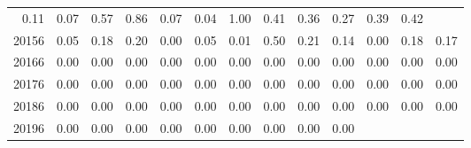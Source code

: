 \begin{table}[!h]
\begin{tabular}{lllllllllllll}
  \multicolumn{1}{|r}{0.11} &
  \multicolumn{1}{r}{0.07} &
  \multicolumn{1}{r}{0.57} &
  \multicolumn{1}{r}{0.86} &
  \multicolumn{1}{r}{0.07} &
  \multicolumn{1}{r}{0.04} &
  \multicolumn{1}{r}{1.00} &
  \multicolumn{1}{r}{0.41} &
  \multicolumn{1}{r}{0.36} &
  \multicolumn{1}{r}{0.27} &
  \multicolumn{1}{r}{0.39} &
  \multicolumn{1}{r}{0.42} \\
\multicolumn{1}{l}{\hspace{1em}20156} &
  \multicolumn{1}{|r}{0.05} &
  \multicolumn{1}{r}{0.18} &
  \multicolumn{1}{r}{0.20} &
  \multicolumn{1}{r}{0.00} &
  \multicolumn{1}{r}{0.05} &
  \multicolumn{1}{r}{0.01} &
  \multicolumn{1}{r}{0.50} &
  \multicolumn{1}{r}{0.21} &
  \multicolumn{1}{r}{0.14} &
  \multicolumn{1}{r}{0.00} &
  \multicolumn{1}{r}{0.18} &
  \multicolumn{1}{r}{0.17} \\
\multicolumn{1}{l}{\hspace{1em}20166} &
  \multicolumn{1}{|r}{0.00} &
  \multicolumn{1}{r}{0.00} &
  \multicolumn{1}{r}{0.00} &
  \multicolumn{1}{r}{0.00} &
  \multicolumn{1}{r}{0.00} &
  \multicolumn{1}{r}{0.00} &
  \multicolumn{1}{r}{0.00} &
  \multicolumn{1}{r}{0.00} &
  \multicolumn{1}{r}{0.00} &
  \multicolumn{1}{r}{0.00} &
  \multicolumn{1}{r}{0.00} &
  \multicolumn{1}{r}{0.00} \\
\multicolumn{1}{l}{\hspace{1em}20176} &
  \multicolumn{1}{|r}{0.00} &
  \multicolumn{1}{r}{0.00} &
  \multicolumn{1}{r}{0.00} &
  \multicolumn{1}{r}{0.00} &
  \multicolumn{1}{r}{0.00} &
  \multicolumn{1}{r}{0.00} &
  \multicolumn{1}{r}{0.00} &
  \multicolumn{1}{r}{0.00} &
  \multicolumn{1}{r}{0.00} &
  \multicolumn{1}{r}{0.00} &
  \multicolumn{1}{r}{0.00} &
  \multicolumn{1}{r}{0.00} \\
\multicolumn{1}{l}{\hspace{1em}20186} &
  \multicolumn{1}{|r}{0.00} &
  \multicolumn{1}{r}{0.00} &
  \multicolumn{1}{r}{0.00} &
  \multicolumn{1}{r}{0.00} &
  \multicolumn{1}{r}{0.00} &
  \multicolumn{1}{r}{0.00} &
  \multicolumn{1}{r}{0.00} &
  \multicolumn{1}{r}{0.00} &
  \multicolumn{1}{r}{0.00} &
  \multicolumn{1}{r}{0.00} &
  \multicolumn{1}{r}{0.00} &
  \multicolumn{1}{r}{0.00} \\
\multicolumn{1}{l}{\hspace{1em}20196} &
  \multicolumn{1}{|r}{0.00} &
  \multicolumn{1}{r}{0.00} &
  \multicolumn{1}{r}{0.00} &
  \multicolumn{1}{r}{0.00} &
  \multicolumn{1}{r}{0.00} &
  \multicolumn{1}{r}{0.00} &
  \multicolumn{1}{r}{0.00} &
  \multicolumn{1}{r}{0.00} &
  \multicolumn{1}{r}{0.00} &

\end{tabular}
\end{table}
